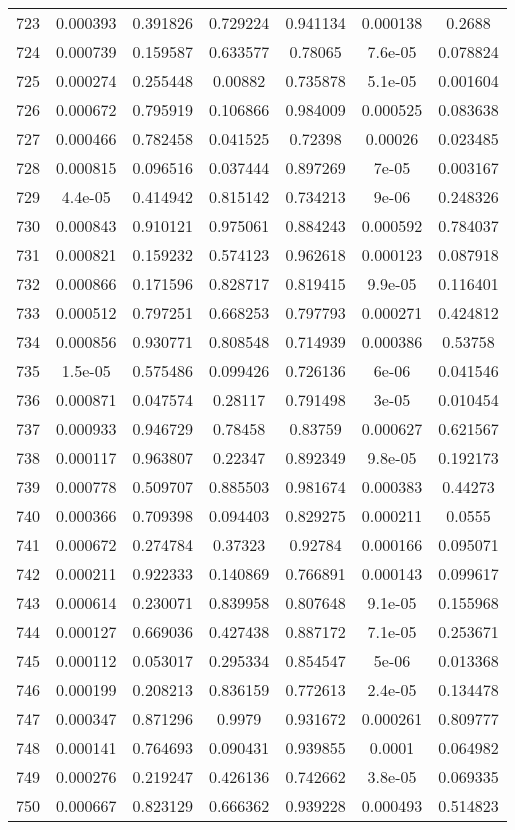 \begin{table}
\begin{tabular}{c|c|c|c|c|c|c}
723 & 0.000393 & 0.391826 & 0.729224 & 0.941134 & 0.000138 & 0.2688\\
724 & 0.000739 & 0.159587 & 0.633577 & 0.78065 & 7.6e-05 & 0.078824\\
725 & 0.000274 & 0.255448 & 0.00882 & 0.735878 & 5.1e-05 & 0.001604\\
726 & 0.000672 & 0.795919 & 0.106866 & 0.984009 & 0.000525 & 0.083638\\
727 & 0.000466 & 0.782458 & 0.041525 & 0.72398 & 0.00026 & 0.023485\\
728 & 0.000815 & 0.096516 & 0.037444 & 0.897269 & 7e-05 & 0.003167\\
729 & 4.4e-05 & 0.414942 & 0.815142 & 0.734213 & 9e-06 & 0.248326\\
730 & 0.000843 & 0.910121 & 0.975061 & 0.884243 & 0.000592 & 0.784037\\
731 & 0.000821 & 0.159232 & 0.574123 & 0.962618 & 0.000123 & 0.087918\\
732 & 0.000866 & 0.171596 & 0.828717 & 0.819415 & 9.9e-05 & 0.116401\\
733 & 0.000512 & 0.797251 & 0.668253 & 0.797793 & 0.000271 & 0.424812\\
734 & 0.000856 & 0.930771 & 0.808548 & 0.714939 & 0.000386 & 0.53758\\
735 & 1.5e-05 & 0.575486 & 0.099426 & 0.726136 & 6e-06 & 0.041546\\
736 & 0.000871 & 0.047574 & 0.28117 & 0.791498 & 3e-05 & 0.010454\\
737 & 0.000933 & 0.946729 & 0.78458 & 0.83759 & 0.000627 & 0.621567\\
738 & 0.000117 & 0.963807 & 0.22347 & 0.892349 & 9.8e-05 & 0.192173\\
739 & 0.000778 & 0.509707 & 0.885503 & 0.981674 & 0.000383 & 0.44273\\
740 & 0.000366 & 0.709398 & 0.094403 & 0.829275 & 0.000211 & 0.0555\\
741 & 0.000672 & 0.274784 & 0.37323 & 0.92784 & 0.000166 & 0.095071\\
742 & 0.000211 & 0.922333 & 0.140869 & 0.766891 & 0.000143 & 0.099617\\
743 & 0.000614 & 0.230071 & 0.839958 & 0.807648 & 9.1e-05 & 0.155968\\
744 & 0.000127 & 0.669036 & 0.427438 & 0.887172 & 7.1e-05 & 0.253671\\
745 & 0.000112 & 0.053017 & 0.295334 & 0.854547 & 5e-06 & 0.013368\\
746 & 0.000199 & 0.208213 & 0.836159 & 0.772613 & 2.4e-05 & 0.134478\\
747 & 0.000347 & 0.871296 & 0.9979 & 0.931672 & 0.000261 & 0.809777\\
748 & 0.000141 & 0.764693 & 0.090431 & 0.939855 & 0.0001 & 0.064982\\
749 & 0.000276 & 0.219247 & 0.426136 & 0.742662 & 3.8e-05 & 0.069335\\
750 & 0.000667 & 0.823129 & 0.666362 & 0.939228 & 0.000493 & 0.514823\\
\end{tabular}
\end{table}
